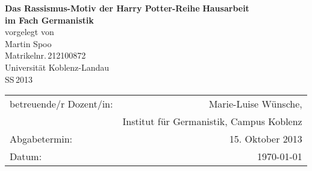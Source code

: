 \begin{titlepage}
	\begin{center}
		\quad
		\vfill
		\Huge{
			 \textbf{Das Rassismus-Motiv der \glqq{}Harry Potter\grqq{}-Reihe}
		}
		\vspace{5mm}
		\vfill
		\large{
			{\bf Hausarbeit\\
			im Fach Germanistik}
		}
		\\
		\vspace{0.5cm}
		\large{
			{vorgelegt von\\
			Martin Spoo\\
			Matrikelnr.\,212100872}
		}
		\vspace{1cm}
		\\
		\Large{
			{Universität Koblenz-Landau}\\
			{SS\,2013}
		}
		\vspace{1cm}
		\begin{table}[b]
			\begin{center}
				\begin{tabular}{lr}
					betreuende/r Dozent/in: & Marie-Luise Wünsche, \\
								&	Institut für Germanistik, Campus Koblenz \\
					\vspace{0.5cm}
					Abgabetermin: & 15. Oktober 2013 \\
					Datum: & \today
				\end{tabular}
			\end{center}
		\end{table}
	\end{center}
\end{titlepage}
\renewcommand{\baselinestretch}{1.1}
\restoregeometry

